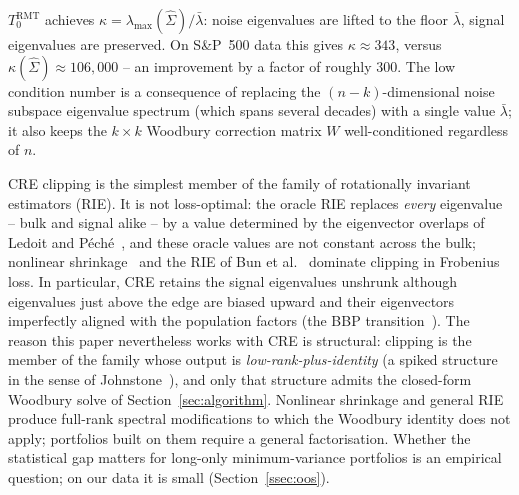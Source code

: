 \begin{remark}
$T_0^{\mathrm{RMT}}$ achieves $\kappa = \lambda_{\max}(\hat\Sigma)/\bar\lambda$:
noise eigenvalues are lifted to the floor $\bar\lambda$, signal eigenvalues are
preserved. On S\&P~500 data this gives $\kappa \approx 343$, versus
$\kappa(\hat\Sigma) \approx 106{,}000$ -- an improvement by a factor of roughly
$300$. The low condition number is a consequence of replacing the
$(n-k)$-dimensional noise subspace eigenvalue spectrum (which spans
several decades) with a single value $\bar\lambda$; it also keeps the
$k \times k$ Woodbury correction matrix $W$ well-conditioned regardless of $n$.
\end{remark}

\begin{remark}\label{rem:rie}
CRE clipping is the simplest member of the family of rotationally invariant
estimators (RIE). It is not loss-optimal: the oracle RIE replaces \emph{every}
eigenvalue -- bulk and signal alike -- by a value determined by the
eigenvector overlaps of Ledoit and P\'ech\'e~\cite{ledoitpeche2011}, and these
oracle values are not constant across the bulk; nonlinear
shrinkage~\cite{ledoit2012,ledoit2020} and the RIE of Bun et
al.~\cite{bun2017} dominate clipping in Frobenius loss. In particular, CRE
retains the signal eigenvalues unshrunk although eigenvalues just above the
edge are biased upward and their eigenvectors imperfectly aligned with the
population factors (the BBP transition~\cite{baik2005,johnstone2001}). The
reason this paper nevertheless works with CRE is structural: clipping is the
member of the family whose output is \emph{low-rank-plus-identity}
(a spiked structure in the sense of Johnstone~\cite{johnstone2001}), and only
that structure admits the closed-form Woodbury solve of
Section~\ref{sec:algorithm}. Nonlinear shrinkage and general RIE produce
full-rank spectral modifications to which the Woodbury identity does not
apply; portfolios built on them require a general factorisation. Whether the
statistical gap matters for long-only minimum-variance portfolios is an
empirical question; on our data it is small
(Section~\ref{ssec:oos}).
\end{remark}

